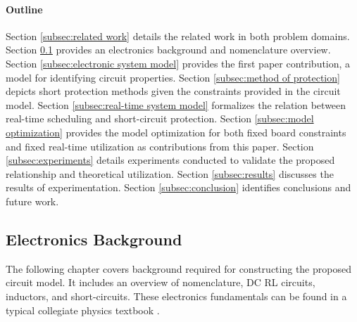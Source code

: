 \paragraph{Outline}
Section \ref{subsec:related work} details the related work in both problem domains.
Section \ref{subsec:electronics background} provides an electronics background and nomenclature overview.
Section \ref{subsec:electronic system model} provides the first paper contribution, a model for identifying circuit properties.
Section \ref{subsec:method of protection} depicts short protection methods given the constraints provided in the circuit model.
Section \ref{subsec:real-time system model} formalizes the relation between real-time scheduling and short-circuit protection.
Section \ref{subsec:model optimization} provides the model optimization for both fixed board constraints and fixed real-time utilization as contributions from this paper.
Section \ref{subsec:experiments} details experiments conducted to validate the proposed relationship and theoretical utilization.
Section \ref{subsec:results} discusses the results of experimentation.
Section \ref{subsec:conclusion} identifies conclusions and future work.



\clearpage \subsection{Electronics Background}\label{subsec:electronics background}
The following chapter covers background required for constructing the proposed circuit model. It includes an overview of nomenclature, DC RL circuits, inductors, and short-circuits. These electronics fundamentals can be found in a typical collegiate physics textbook \cite{uniphy}.

